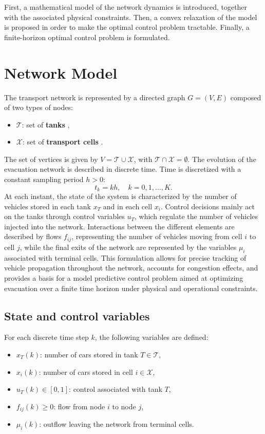 \documentclass[12pt]{article}
\begin{document}
First, a mathematical model of the network dynamics is introduced, together with the associated physical constraints.  
Then, a convex relaxation of the model is proposed in order to make the optimal control problem tractable.  
Finally, a finite-horizon optimal control problem is formulated.

\section{Network Model}
The transport network is represented by a directed graph $G = (V,E)$ composed of two types of nodes:
\begin{itemize}
    \item $\mathcal{T}$: set of \textbf{tanks} ,
    \item $\mathcal{X}$: set of \textbf{transport cells} .
\end{itemize}

The set of vertices is given by $V = \mathcal{T} \cup \mathcal{X}$, with $\mathcal{T} \cap \mathcal{X} = \emptyset$. The evolution of the evacuation network is described in discrete time. Time is discretized with a constant sampling period $h > 0$:
\[
t_k = k h, \quad k = 0,1,\dots,K.
\] 
At each instant, the state of the system is characterized by the number of vehicles stored in each tank $x_T$ and in each cell $x_i$. Control decisions mainly act on the tanks through control variables $u_T$, which regulate the number of vehicles injected into the network. Interactions between the different elements are described by flows \(f_{ij}\), representing the number of vehicles moving from cell $i$ to cell $j$, while the final exits of the network are represented by the variables $\mu_i$ associated with terminal cells. This formulation allows for precise tracking of vehicle propagation throughout the network, accounts for congestion effects, and provides a basis for a model predictive control problem aimed at optimizing evacuation over a finite time horizon under physical and operational constraints.



\subsection{State and control variables}

For each discrete time step $k$, the following variables are defined:
\begin{itemize}
    \item $x_T(k)$: number of cars stored in tank $T \in \mathcal{T}$,
    \item $x_i(k)$: number of cars stored in cell $i \in \mathcal{X}$,
    \item $u_T(k) \in [0,1]$: control associated with tank $T$,
    \item $f_{ij}(k) \ge 0$: flow from node $i$ to node $j$,
    \item $\mu_i(k)$: outflow leaving the network from terminal cells.
\end{itemize}
\end{document}
